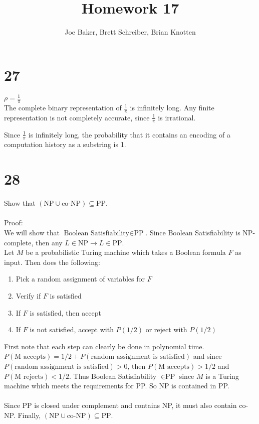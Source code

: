 \documentclass[letterpaper,notitlepage,twoside]{article}
\begin{document}
\title{Homework 17}
\author{Joe Baker, Brett Schreiber, Brian Knotten}
\maketitle

\section*{27}
$\rho = \frac{1}{\pi}$ \\
The complete binary representation of $\frac{1}{\pi}$ is infinitely long. Any finite representation is not completely accurate, since $\frac{1}{\pi}$ is irrational.

Since $\frac{1}{\pi}$ is infinitely long, the probability that it contains an encoding of a computation history as a substring is 1.


\section*{28}
Show that $\left(\text{NP}\cup\text{co-NP}\right)\subseteq\text{PP}$.
\\\\
Proof:
\\
We will show that $\text{Boolean Satisfiability}\in\text{PP}$. Since Boolean Satisfiability is NP-complete, then any $L \in \text{NP} \rightarrow L \in \text{PP}$.
\\
Let $M$ be a probabilistic Turing machine which takes a Boolean formula $F$ as input. Then does the following:
\begin{enumerate}
\item Pick a random assignment of variables for $F$
\item Verify if $F$ is satisfied
\item If $F$ is satisfied, then accept
\item If $F$ is not satisfied, accept with $P(1/2)$ or reject with $P(1/2)$
\end{enumerate}
First note that each step can clearly be done in polynomial time. $P(\text{M accepts}) = 1/2 + P(\text{random assignment is satisfied})$ and since $P(\text{random assignment is satisfied}) > 0$, then $P(\text{M accepts}) > 1/2$ and $P(\text{M rejects}) < 1/2$. Thus Boolean Satisfiability $\in \text{PP}$ since $M$ is a Turing machine which meets the requirements for PP. So NP is contained in PP.
\\\\
Since PP is closed under complement and contains NP, it must also contain co-NP. Finally, $\left(\text{NP}\cup\text{co-NP}\right)\subseteq\text{PP}$.
\end{document}
